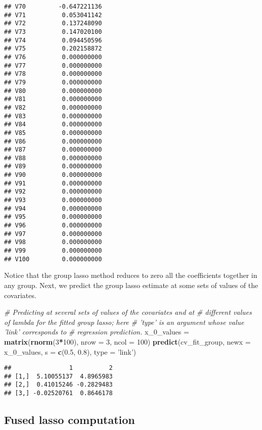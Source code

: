 \documentclass[
]{book}
\newenvironment{Shaded}{\begin{snugshade}}{\end{snugshade}}
\newcommand{\CommentTok}[1]{\textcolor[rgb]{0.56,0.35,0.01}{\textit{#1}}}
\newcommand{\DataTypeTok}[1]{\textcolor[rgb]{0.13,0.29,0.53}{#1}}
\newcommand{\DecValTok}[1]{\textcolor[rgb]{0.00,0.00,0.81}{#1}}
\newcommand{\FloatTok}[1]{\textcolor[rgb]{0.00,0.00,0.81}{#1}}
\newcommand{\KeywordTok}[1]{\textcolor[rgb]{0.13,0.29,0.53}{\textbf{#1}}}
\newcommand{\NormalTok}[1]{#1}
\newcommand{\OperatorTok}[1]{\textcolor[rgb]{0.81,0.36,0.00}{\textbf{#1}}}
\newcommand{\StringTok}[1]{\textcolor[rgb]{0.31,0.60,0.02}{#1}}
\begin{document}
\begin{verbatim}
## V70         -0.647221136
## V71          0.053041142
## V72          0.137248090
## V73          0.147020100
## V74          0.094450596
## V75          0.202158872
## V76          0.000000000
## V77          0.000000000
## V78          0.000000000
## V79          0.000000000
## V80          0.000000000
## V81          0.000000000
## V82          0.000000000
## V83          0.000000000
## V84          0.000000000
## V85          0.000000000
## V86          0.000000000
## V87          0.000000000
## V88          0.000000000
## V89          0.000000000
## V90          0.000000000
## V91          0.000000000
## V92          0.000000000
## V93          0.000000000
## V94          0.000000000
## V95          0.000000000
## V96          0.000000000
## V97          0.000000000
## V98          0.000000000
## V99          0.000000000
## V100         0.000000000
\end{verbatim}

Notice that the group lasso method reduces to zero all the coefficients together in any group. Next, we predict the group lasso estimate at some sets of values of the covariates.

\begin{Shaded}
\begin{Highlighting}[]
\CommentTok{# Predicting at several sets of values of the covariates and at}
\CommentTok{# different values of lambda for the fitted group lasso; here}
\CommentTok{# 'type' is an argument whose value 'link' corresponds to}
\CommentTok{# regression prediction.}
\NormalTok{x_}\DecValTok{0}\NormalTok{_values =}\StringTok{ }\KeywordTok{matrix}\NormalTok{(}\KeywordTok{rnorm}\NormalTok{(}\DecValTok{3}\OperatorTok{*}\DecValTok{100}\NormalTok{), }\DataTypeTok{nrow =} \DecValTok{3}\NormalTok{, }\DataTypeTok{ncol =} \DecValTok{100}\NormalTok{)}
\KeywordTok{predict}\NormalTok{(cv_fit_group, }\DataTypeTok{newx =}\NormalTok{ x_}\DecValTok{0}\NormalTok{_values, }\DataTypeTok{s =} \KeywordTok{c}\NormalTok{(}\FloatTok{0.5}\NormalTok{, }\FloatTok{0.8}\NormalTok{),}
        \DataTypeTok{type =} \StringTok{'link'}\NormalTok{)}
\end{Highlighting}
\end{Shaded}

\begin{verbatim}
##                1          2
## [1,]  5.10055137  4.8965983
## [2,]  0.41015246 -0.2829483
## [3,] -0.02520761  0.8646178
\end{verbatim}

\hypertarget{fusedlasso-computation}{%
\subsection{Fused lasso computation}\label{fusedlasso-computation}}
\end{document}
